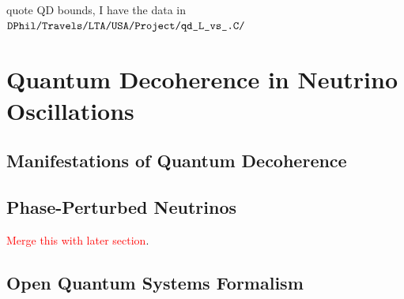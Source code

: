 quote QD bounds, I have the data in $\verb!DPhil/Travels/LTA/USA/Project/qd_L_vs_.C/!$

\section{Quantum Decoherence in Neutrino Oscillations}

\subsection{Manifestations of Quantum Decoherence}

\subsection{Phase-Perturbed Neutrinos}
\textcolor{red}{Merge this with later section}.

\subsection{Open Quantum Systems Formalism}

